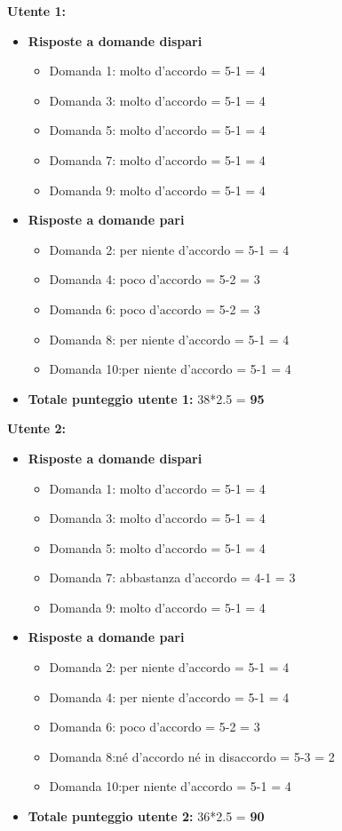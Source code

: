\textbf{Utente 1:}
\begin{itemize}
    \item \textbf{Risposte a domande dispari}
    \begin{itemize}
        \item Domanda 1: molto d'accordo = 5-1 = 4
        \item Domanda 3: molto d'accordo = 5-1 = 4
        \item Domanda 5: molto d'accordo = 5-1 = 4
        \item Domanda 7: molto d'accordo = 5-1 = 4
        \item Domanda 9: molto d'accordo = 5-1 = 4
    \end{itemize}
    \item \textbf{Risposte a domande pari}
    \begin{itemize}
        \item Domanda 2: per niente d'accordo = 5-1 = 4
        \item Domanda 4: poco d'accordo = 5-2 = 3
        \item Domanda 6: poco d'accordo = 5-2 = 3
        \item Domanda 8: per niente d'accordo = 5-1 = 4
        \item Domanda 10:per niente d'accordo = 5-1 = 4
    \end{itemize}

    \item \textbf{Totale punteggio utente 1: } 38*2.5 = \textbf{95}
    
\end{itemize}
\textbf{Utente 2:}
\begin{itemize}
    \item \textbf{Risposte a domande dispari}
    \begin{itemize}
        \item Domanda 1: molto d'accordo = 5-1 = 4
        \item Domanda 3: molto d'accordo = 5-1 = 4
        \item Domanda 5: molto d'accordo = 5-1 = 4
        \item Domanda 7: abbastanza d'accordo = 4-1 = 3
        \item Domanda 9: molto d'accordo = 5-1 = 4
    \end{itemize}
    \item \textbf{Risposte a domande pari}
    \begin{itemize}
        \item Domanda 2: per niente d'accordo = 5-1 = 4
        \item Domanda 4: per niente d'accordo = 5-1 = 4
        \item Domanda 6: poco d'accordo = 5-2 = 3
        \item Domanda 8:né d'accordo né in disaccordo = 5-3 = 2
        \item Domanda 10:per niente d'accordo = 5-1 = 4
    \end{itemize}

    \item \textbf{Totale punteggio utente 2: } 36*2.5 = \textbf{90}
    
\end{itemize}
